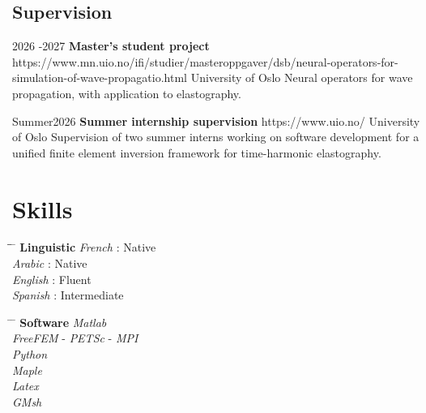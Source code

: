 \documentclass[10pt]{article} %
\begin{document}

\subsection{Supervision}

\job
{2026 -}{2027}
{\textbf{Master's student project}}
{https://www.mn.uio.no/ifi/studier/masteroppgaver/dsb/neural-operators-for-simulation-of-wave-propagatio.html}
{University of Oslo}
{Neural operators for wave propagation, with application to elastography.}

\job
{Summer}{2026}
{\textbf{Summer internship supervision}}
{https://www.uio.no/}
{University of Oslo}
{Supervision of two summer interns working on software development for a unified finite element inversion framework for time-harmonic elastography.}










\section{Skills}
\parbox{0.5\textwidth}{ %
	\begin{tabbing} %
		\hspace{2.5cm} \= \hspace{1.5cm}\= \hspace{4cm} \= \kill %
		{\bf Linguistic} \> \textit{French} \>:   Native\\ %
		\> 	\textit{Arabic} \>:  Native\\
		\> 	\textit{English} \>:  Fluent\\
		\> 	\textit{Spanish} \>:   Intermediate\\
\end{tabbing}}
\hspace{0.5cm}
\parbox{0.5\textwidth}{ %
	\begin{tabbing} %
		\hspace{3.5cm} \= \hspace{2cm} \= \kill %
		{\bf Software} 	\>  \textit{Matlab}\\
\> \textit{FreeFEM} - \textit{PETSc} - \textit{MPI}\\
\> \textit{Python}\\
\> \textit{Maple}\\
\> 	\textit{Latex}\\
\> 	\textit{GMsh} 
\end{tabbing}}
\end{document}
